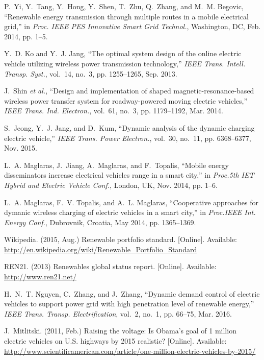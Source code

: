 \documentclass[journal]{IEEEtran}
\begin{document}
\begin{thebibliography}{1}
P.~Yi, Y.~Tang, Y.~Hong, Y.~Shen, T.~Zhu, Q.~Zhang, and M.~M. Begovic,
  ``Renewable energy transmission through multiple routes in a mobile
  electrical grid,'' in \emph{Proc. IEEE PES Innovative Smart Grid Technol.},
  Washington, DC, Feb. 2014, pp. 1--5.

Y.~D. Ko and Y.~J. Jang, ``The optimal system design of the online electric
  vehicle utilizing wireless power transmission technology,'' \emph{{IEEE}
  Trans. Intell. Transp. Syst.}, vol.~14, no.~3, pp. 1255--1265, Sep. 2013.

J.~{Shin \textit{et al.}}, ``Design and implementation of shaped
  magnetic-resonance-based wireless power transfer system for roadway-powered
  moving electric vehicles,'' \emph{{IEEE} Trans. Ind. Electron.}, vol.~61,
  no.~3, pp. 1179--1192, Mar. 2014.

S.~Jeong, Y.~J. Jang, and D.~Kum, ``Dynamic analysis of the dynamic charging
  electric vehicle,'' \emph{{IEEE} Trans. Power Electron.}, vol.~30, no.~11,
  pp. 6368--6377, Nov. 2015.

L.~A. Maglaras, J.~Jiang, A.~Maglaras, and F.~Topalis, ``Mobile energy
  disseminators increase electrical vehicles range in a smart city,'' in
  \emph{Proc.5th IET Hybrid and Electric Vehicle Conf.}, London, UK, Nov. 2014,
  pp. 1--6.

L.~A. Maglaras, F.~V. Topalis, and A.~L. Maglaras, ``Cooperative approaches for
  dymanic wireless charging of electric vehicles in a smart city,'' in
  \emph{Proc.IEEE Int. Energy Conf.}, Dubrovnik, Croatia, May 2014, pp.
  1365--1369.

Wikipedia. (2015, Aug.) Renewable portfolio standard. [Online]. Available:
  \url{http://en.wikipedia.org/wiki/Renewable_Portfolio_Standard}


REN21. (2013) Renewables global status report. [Online]. Available:
  \url{http://www.ren21.net/}


H.~N.~T. Nguyen, C.~Zhang, and J.~Zhang, ``Dynamic demand control of electric
  vehicles to support power grid with high penetration level of renewable
  energy,'' \emph{IEEE Trans. Transp. Electrification}, vol.~2, no.~1, pp.
  66--75, Mar. 2016.

J.~Mitlitski. (2011, Feb.) Raising the voltage: Is {Obama's} goal of 1 million
  electric vehicles on {U.S.} highways by 2015 realistic? [Online]. Available:
  \url{http://www.scientificamerican.com/article/one-million-electric-vehicles-by-2015/}



\end{thebibliography}
\end{document}
